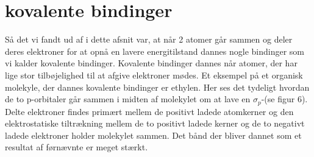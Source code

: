 \section{kovalente bindinger}
Så det vi fandt ud af i dette afsnit var, at når 2 atomer går sammen og deler deres elektroner for at opnå en lavere energitilstand dannes nogle bindinger som vi kalder kovalente bindinger. Kovalente bindinger dannes når atomer, der har lige stor tilbøjelighed til at afgive elektroner mødes. Et eksempel på et organisk molekyle, der dannes kovalente bindinger er ethylen. Her ses det tydeligt hvordan de to p-orbitaler går sammen i midten af molekylet om at lave en $\sigma_p$-(se figur 6). Delte elektroner findes primært mellem de positivt ladede atomkerner og den elektrostatiske tiltrækning mellem de to positivt ladede kerner og de to negativt ladede elektroner holder molekylet sammen. Det bånd der bliver dannet som et resultat af førnævnte er meget stærkt.
